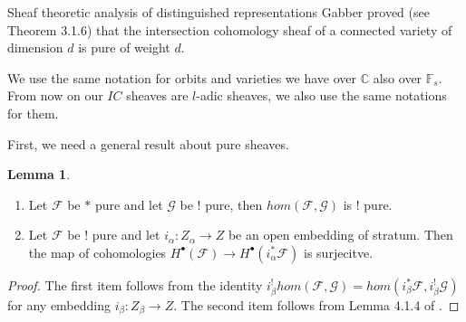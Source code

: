 \documentclass[12pt]{article}
\newcommand{\F}{\mathbb{F}}
\newcommand{\C}{\mathbb{C}}
\newcommand{\<}{\langle}
\renewcommand{\>}{\rangle}
\theoremstyle{plain}
\theoremstyle{definition}
\newtheorem{lemma}[theorem]{Lemma}
\begin{document}
\begin{section}{Sheaf theoretic analysis of distinguished representations}
Gabber proved (see \cite{cataldo} Theorem 3.1.6) that the intersection cohomology sheaf of a connected variety of dimension $d$ is pure of weight $d$.

We use the same notation for orbits and varieties we have over $\C$ also over $\F_s$. From now on our $IC$ sheaves are $l$-adic sheaves, we also use the same notations for them.

First, we need a general result about pure sheaves.

\begin{lemma}\label{Exts are pure}
    \begin{enumerate}
        \item Let $\mathcal{F}$ be $*$ pure and let $\mathcal{G}$ be $!$ pure, then $hom(\mathcal{F},\mathcal{G})$ is $!$ pure.
        \item Let $\mathcal{F}$ be $!$ pure and let $i_\alpha:Z_\alpha\rightarrow Z$ be an open embedding of stratum. Then the map of cohomologies $H^\bullet(\mathcal{F})\rightarrow H^\bullet(i_\alpha^*\mathcal{F})$ is surjecitve.
    \end{enumerate}
\end{lemma}

\begin{proof}
    The first item follows from the identity $i_\beta^!hom(\mathcal{F},\mathcal{G})=hom(i_\beta^*\mathcal{F},i_\beta^!\mathcal{G})$ for any embedding  $i_\beta:Z_\beta\rightarrow Z$.
    The second item follows from Lemma 4.1.4 of \cite{ginzburg2025pointwisepurityderivedsatake}.
\end{proof}



\end{section}
\end{document}
